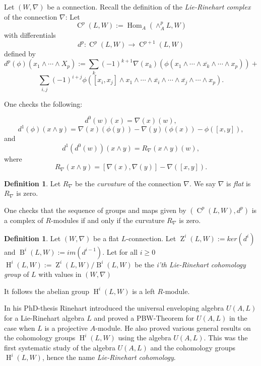 \documentclass{amsart}
\theoremstyle{plain}
\theoremstyle{definition}
\newtheorem{definition}[theorem]{Definition}
\theoremstyle{remark}
\numberwithin{equation}{theorem}
\begin{document}
Let $(W,\nabla)$ be a connection.
Recall the definition
of the \emph{Lie-Rinehart complex} of the connection $\nabla$:
Let 
\[ {\operatorname{C} }^p(L, W):={\operatorname{Hom} }_{A}(\wedge^p_{A} L, W) \]
with differentials
\[ d^p:{\operatorname{C} }^p(L,W) \rightarrow {\operatorname{C} }^{p+1}(L,W) \]
defined by
\[ d^p(\phi)(x_1\wedge \cdots \wedge X_p):=\sum_{k}(-1)^{k+1}\nabla(x_k)(\phi(x_1\wedge \cdots \wedge 
\overline{x_k}\wedge \cdots \wedge x_p))+\]
\[\sum_{i,j}(-1)^{i+j}\phi([x_i,x_j]\wedge x_1 \wedge \cdots \wedge \overline{x_i}\wedge \cdots \wedge 
\overline{x_j} \wedge \cdots \wedge x_p).\]

One checks the following:

\[ d^0(w)(x)=\nabla(x)(w),\]
\[ d^1(\phi)(x\wedge y)=\nabla(x)(\phi(y))-\nabla(y)(\phi(x))-\phi([x,y]),\]
and
\[ d^1(d^0(w))(x\wedge y)=R_\nabla(x\wedge y)(w), \]
where
\[ R_\nabla(x\wedge y)=[\nabla(x),\nabla(y)]-\nabla([x,y]).\]

\begin{definition} Let $R_{\nabla}$ be the \emph{curvature} of the connection $\nabla$.
We say $\nabla$ is \emph{flat} is $R_{\nabla}$ is zero.
\end{definition}

One checks that the sequence  of groups and maps given by 
$( {\operatorname{C} }^p(L,W), d^p)$ is a complex of ${R}$-modules if and only if the curvature $R_\nabla$  is zero. 

\begin{definition} Let $(W,\nabla)$ be a flat $L$-connection. Let ${\operatorname{Z}}^i(L,W):=ker(d^i)$ and 
${\operatorname{B}}^i(L,W):= im(d^{i-1})$.
 Let for all $i\geq 0$ ${\operatorname{H} }^i(L,W):={\operatorname{Z}}^i(L,W)/{\operatorname{B}}^i(L,W)$ be the \emph{i'th Lie-Rinehart cohomology group}
of $L$ with values in $(W,\nabla)$
\end{definition}

It follows the abelian group ${\operatorname{H} }^i(L,W)$ is a left ${R}$-module.

In his PhD-thesis \cite{rinehart} Rinehart introduced the universal enveloping algebra $U({A},L)$ for a Lie-Rinehart
algebra $L$ and proved a PBW-Theorem for $U({A},L)$ in the case when $L$ is a projective ${A}$-module. He also proved various
general results on the cohomology groups ${\operatorname{H} }^i(L,W)$ using the algebra $U({A},L)$. This was the first systematic
study of the algebra $U({A},L)$ and the cohomology groups ${\operatorname{H} }^i(L,W)$, hence the name  \emph{Lie-Rinehart cohomology}.
\end{document}
